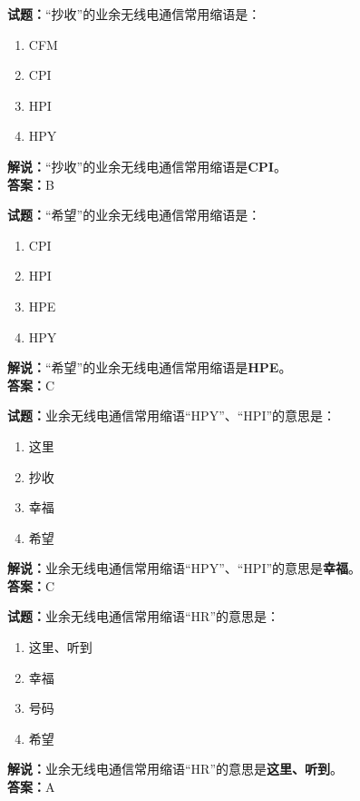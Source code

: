 \documentclass{ctexbook}
\begin{document}
\vspace{1em}

\textbf{试题：}“抄收”的业余无线电通信常用缩语是：
\begin{enumerate}[leftmargin=3em]
  \item CFM
  \item CPI
  \item HPI
  \item HPY
\end{enumerate}
\noindent\textbf{解说：}“抄收”的业余无线电通信常用缩语是\textbf{CPI}。\\\noindent\textbf{答案：}B

\vspace{1em}

\textbf{试题：}“希望”的业余无线电通信常用缩语是：
\begin{enumerate}[leftmargin=3em]
  \item CPI
  \item HPI
  \item HPE
  \item HPY
\end{enumerate}
\noindent\textbf{解说：}“希望”的业余无线电通信常用缩语是\textbf{HPE}。\\\noindent\textbf{答案：}C

\vspace{1em}

\textbf{试题：}业余无线电通信常用缩语“HPY”、“HPI”的意思是：
\begin{enumerate}[leftmargin=3em]
  \item 这里
  \item 抄收
  \item 幸福
  \item 希望
\end{enumerate}
\noindent\textbf{解说：}业余无线电通信常用缩语“HPY”、“HPI”的意思是\textbf{幸福}。\\\noindent\textbf{答案：}C

\vspace{1em}

\textbf{试题：}业余无线电通信常用缩语“HR”的意思是：
\begin{enumerate}[leftmargin=3em]
  \item 这里、听到
  \item 幸福
  \item 号码
  \item 希望
\end{enumerate}
\noindent\textbf{解说：}业余无线电通信常用缩语“HR”的意思是\textbf{这里、听到}。\\\noindent\textbf{答案：}A
\end{document}
